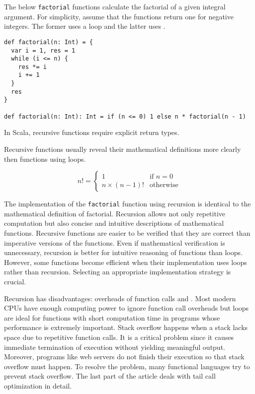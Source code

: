 The below \verb!factorial! functions calculate the factorial of a given integral
argument. For simplicity, assume that the functions return one for negative
integers. The former uses a loop and the latter uses .

\begin{verbatim}
def factorial(n: Int) = {
  var i = 1, res = 1
  while (i <= n) {
    res *= i
    i += 1
  }
  res
}

def factorial(n: Int): Int = if (n <= 0) 1 else n * factorial(n - 1)
\end{verbatim}

In Scala, recursive functions require explicit return types.

Recursive functions usually reveal their mathematical definitions more clearly
then functions using loops.

\[n!=\begin{cases}1 & \text{if } n=0\\n \times (n-1)! &
\text{otherwise}\end{cases}\]

The implementation of the \verb!factorial! function using recursion is identical
to the mathematical definition of factorial. Recursion allows not only repetitive
computation but also concise and intuitive descriptions of mathematical
functions. Recursive functions are easier to be verified that they are correct
than imperative versions of the functions. Even if mathematical verification is
unnecessary, recursion is better for intuitive reasoning of functions than loops.
However, some functions become efficient when their implementation uses loops
rather than recursion. Selecting an appropriate implementation strategy is
crucial.

Recursion has disadvantages: overheads of function calls and . Most modern CPUs have enough computing power to ignore function call
overheads but loops are ideal for functions with short computation time in
programs whose performance is extremely important. Stack overflow happens when a
stack lacks space due to repetitive function calls. It is a critical problem
since it causes immediate termination of execution without yielding meaningful
output. Moreover, programs like web servers do not finish their execution so that
stack overflow must happen. To resolve the problem, many functional languages try
 to prevent stack overflow. The last part of the
article deals with tail call optimization in detail.

